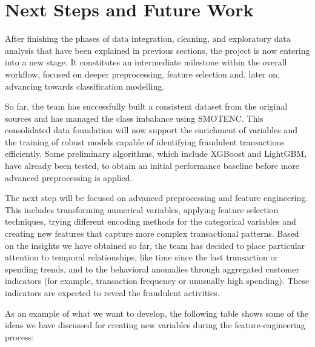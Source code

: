 \documentclass[12pt]{report} %
\begin{document}
\chapter{Next Steps and Future Work}

After finishing the phases of data integration, cleaning, and exploratory data analysis that have been explained in previous sections, the project is now entering into a new stage. It constitutes an intermediate milestone within the overall workflow, focused on deeper preprocessing, feature selection and, later on, advancing towards classification modelling. 

So far, the team has successfully built a consistent dataset from the original sources and has managed the class imbalance using SMOTENC. This consolidated data foundation will now support the enrichment of variables and the training of robust models capable of identifying fraudulent transactions efficiently. Some preliminary algorithms, which include XGBoost and LightGBM,  have already been tested, to obtain an initial performance baseline before more advanced preprocessing is applied.

The next step will be focused on advanced preprocessing and feature engineering. This includes transforming numerical variables, applying feature selection techniques, trying different encoding methods for the categorical variables and creating new features that capture more complex transactional patterns. Based on the insights we have obtained so far, the team has decided to place particular attention to temporal relationships, like time since the last transaction or spending trends, and to the behavioral anomalies through aggregated customer indicators (for example, transaction frequency or unusually high spending). These indicators are expected to reveal the fraudulent activities.

As an example of what we want to develop, the following table shows some of the ideas we have discussed for creating new variables during the feature-engineering process: 
\end{document}
